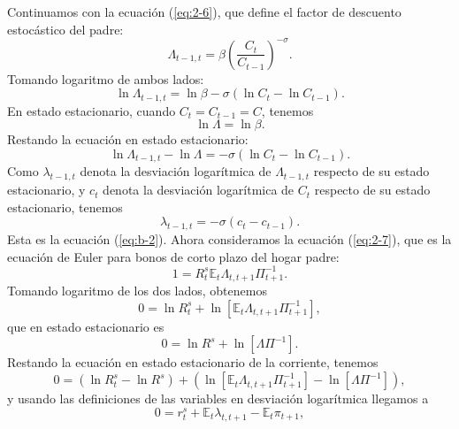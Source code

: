 \documentclass[../../entrega.tex]{subfiles}
\begin{document}
Continuamos con la ecuación (\ref{eq:2-6}), que define el factor de descuento estocástico del padre:
\begin{equation*}
    \Lambda_{t-1,t} = \beta \left(\frac{C_t}{C_{t-1}}\right)^{-\sigma}.
\end{equation*}
Tomando logaritmo de ambos lados:
\begin{equation*}
    \ln \Lambda_{t-1,t} = \ln \beta - \sigma(\ln C_t - \ln C_{t-1}).
\end{equation*}
En estado estacionario, cuando $C_t = C_{t-1} = C$, tenemos
\begin{equation*}
    \ln \Lambda = \ln \beta.
\end{equation*}
Restando la ecuación en estado estacionario:
\begin{equation*}
    \ln \Lambda_{t-1,t} - \ln \Lambda = -\sigma(\ln C_t - \ln C_{t-1}).
\end{equation*}
Como $\lambda_{t-1,t}$ denota la desviación logarítmica de $\Lambda_{t-1,t}$ respecto de su estado estacionario, y $c_t$ denota la desviación logarítmica de $C_t$ respecto de su estado estacionario, tenemos
\begin{equation*}
    \lambda_{t-1,t} = -\sigma(c_t - c_{t-1}).
\end{equation*}
Esta es la ecuación (\ref{eq:b-2}).
Ahora consideramos la ecuación (\ref{eq:2-7}), que es la ecuación de Euler para bonos de corto plazo del hogar padre:
\begin{equation*}
    1 = R_t^s \mathbb{E}_t \Lambda_{t,t+1} \Pi_{t+1}^{-1}.
\end{equation*}
Tomando logaritmo de los dos lados, obtenemos
\begin{equation*}
    0 = \ln R_t^s + \ln [\mathbb{E}_t \Lambda_{t,t+1} \Pi_{t+1}^{-1}],
\end{equation*}
que en estado estacionario es
\begin{equation*}
    0 = \ln R^s + \ln [\Lambda \Pi^{-1}].
\end{equation*}
Restando la ecuación en estado estacionario de la corriente, tenemos
\begin{equation*}
    0 = (\ln R_t^s - \ln R^s) + (\ln [\mathbb{E}_t \Lambda_{t,t+1} \Pi_{t+1}^{-1}] - \ln [\Lambda \Pi^{-1}]),
\end{equation*}
y usando las definiciones de las variables en desviación logarítmica llegamos a
\begin{equation*}
    0 = r_t^s + \mathbb{E}_t \lambda_{t,t+1} - \mathbb{E}_t \pi_{t+1},
\end{equation*}
\end{document}
